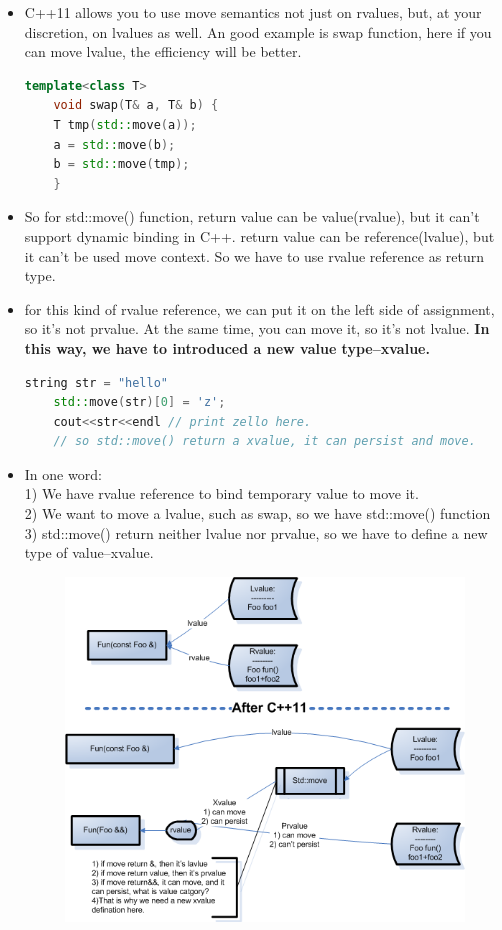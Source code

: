 \documentclass[a4paper,12pt,twoside]{book}
\begin{document}
\begin{itemize}
	\item C++11 allows you to use move semantics not just on rvalues, but, at your discretion, on lvalues as well. An good example is swap function, here if you can move lvalue, the efficiency will be better. 
	
	\begin{lstlisting}[frame=single, language=c++, mathescape=true]
	template<class T> 
	void swap(T& a, T& b) { 
	T tmp(std::move(a));
	a = std::move(b); 
	b = std::move(tmp);
	} 
	\end{lstlisting}
	
	\item So for std::move() function, return value can be value(rvalue), but it can't support dynamic binding in C++.  return value can be reference(lvalue), but it can't be used move context. So we have to use rvalue reference as return type. 
	
	\item for this kind of rvalue reference, we can put it on the left side of assignment, so it's not prvalue. At the same time, you can move it, so it's not lvalue.  \textbf{In this way, we have to introduced a new value type--xvalue.}    
	\begin{lstlisting}[frame=single, language=c++, mathescape=true]
	string str = "hello"
	std::move(str)[0] = 'z';
	cout<<str<<endl // print zello here.
	// so std::move() return a xvalue, it can persist and move.
	\end{lstlisting}
	
	\item In one word: \\
	1) We have rvalue reference to bind temporary value to move it.\\
	2) We want to move a lvalue, such as swap, so we have std::move() function \\
	3) std::move() return neither lvalue nor prvalue, so we have to define a new type of value--xvalue. 
	
	\begin{figure}
		\centering
		\includegraphics[width=0.9\linewidth]{pics/xvalue}
		\caption{}
		\label{fig:xvalue}
	\end{figure}
	
\end{itemize}
\end{document}
